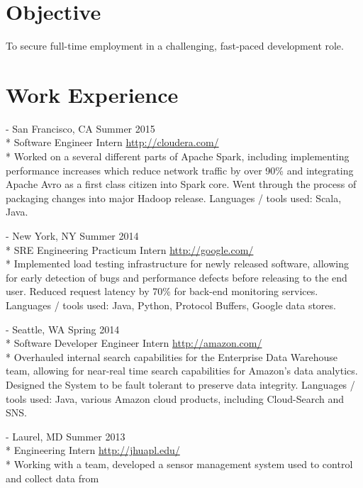 \documentclass[a4paper,margin,line]{resume}
\newcommand{\rurl}[1]{\hfill {\footnotesize \url{#1}}}
\newcommand{\rdate}[1]{\hfill {\small #1}}
\renewcommand{\employer}[5]{ \item[#1] - #2 \rdate{#3} \\* #4 \rurl{#5} \\*}
\begin{document}
\begin{resume}
\section{\mysidestyle Objective}
    To secure full-time employment in a challenging, fast-paced development role.
\section{\mysidestyle Work Experience}
	\begin{asparadesc}
        \employer{Cloudera}{San Francisco, CA}{Summer 2015}{Software Engineer Intern}
        {http://cloudera.com/}
        \small
        Worked on a several different parts of Apache Spark, including implementing performance
        increases which reduce network traffic by over 90\% and integrating Apache
        Avro as a first class citizen into Spark core. Went through the process of packaging
        changes into major Hadoop release. Languages / tools used: 
        Scala, Java.
        \normalsize
        \\
        \employer{Google}{New York, NY}{Summer 2014}{SRE Engineering Practicum Intern}
        {http://google.com/}
		\small
        Implemented load testing infrastructure for newly released software,
        allowing for early detection of bugs and performance defects before
        releasing to the end user. Reduced request latency by 70\% for 
        back-end monitoring services. Languages / tools used: Java, Python, 
        Protocol Buffers, Google data stores.
		\normalsize
		\\
		\employer{Amazon}{Seattle, WA}{Spring 2014}{Software Developer Engineer Intern}
        {http://amazon.com/}
		\small
	    Overhauled internal search capabilities for the Enterprise Data Warehouse
        team, allowing for near-real time search capabilities for Amazon's data
        analytics. Designed the System to be fault tolerant to preserve data integrity.
        Languages / tools used: Java, various Amazon cloud products, including Cloud-Search
        and SNS.
        \normalsize
		\\
		\employer{John Hopkins University Applied Physics Lab}{Laurel, MD}
        {Summer 2013}{Engineering Intern}{http://jhuapl.edu/}
		\small
		Working with a team, developed a sensor management system used to control and collect data from

\end{asparadesc}
\end{resume}
\end{document}
